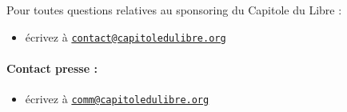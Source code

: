 

Pour toutes questions relatives au sponsoring du Capitole du Libre :
\begin{itemize}
\item[\logo] écrivez à \href{mailto:contact@capitoledulibre.org}{\nolinkurl{contact@capitoledulibre.org}}
\end{itemize}
\paragraph{Contact presse :}
\begin{itemize}
\item[\logo] écrivez à \href{mailto:comm@capitoledulibre.org}{\nolinkurl{comm@capitoledulibre.org}}
\end{itemize}
